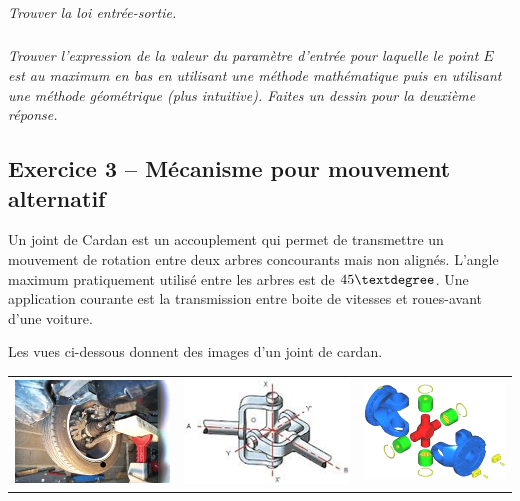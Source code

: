 \documentclass[11pt,oneside]{article}
\begin{document}
\subparagraph{}
\textit{Trouver la loi entrée-sortie. }




\subparagraph{}
\textit{Trouver l'expression de la valeur du paramètre d'entrée pour laquelle le point $E$ est au maximum en bas en utilisant une méthode mathématique puis en utilisant une méthode géométrique (plus intuitive). Faites un dessin pour la deuxième réponse.}




\subsection*{Exercice 3 -- Mécanisme pour mouvement alternatif}
\setcounter{subparagraph}{0}


Un joint de Cardan est un accouplement qui permet de transmettre un mouvement de rotation entre deux arbres concourants mais non alignés. L'angle maximum pratiquement utilisé entre les arbres est de $45\textdegree$. Une application courante est la transmission entre boite de vitesses  et roues-avant d’une voiture. 

Les vues ci-dessous donnent des images d’un joint de cardan.

\begin{center}
\begin{tabular}{ccc}
\includegraphics[width=.3\textwidth]{png/fig3_1} & 
\includegraphics[width=.3\textwidth]{png/fig3_2} & 
\includegraphics[width=.3\textwidth]{png/fig3_3} 
\end{tabular}
\end{center}
\end{document}
